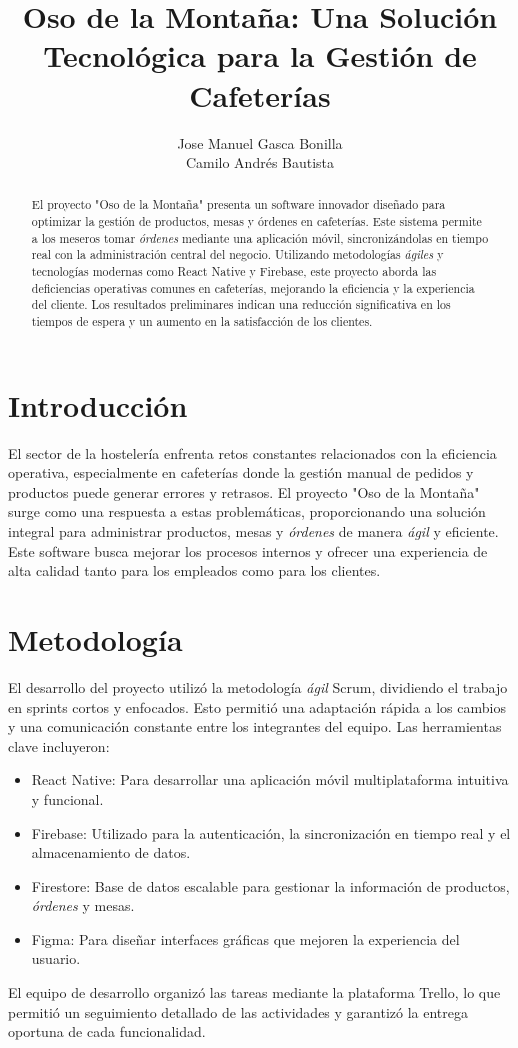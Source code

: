 \documentclass[12pt,a4paper]{article}
\title{Oso de la Monta\~na: Una Soluci\'on Tecnol\'ogica para la Gesti\'on de Cafeter\'ias}
\author{Jose Manuel Gasca Bonilla \\
Camilo Andr\'es Bautista}
\date{}
\begin{document}
\maketitle

\begin{abstract}
El proyecto "Oso de la Monta\~na" presenta un software innovador dise\~nado para optimizar la gesti\'on de productos, mesas y \'ordenes en cafeter\'ias. Este sistema permite a los meseros tomar \textit{\'ordenes} mediante una aplicaci\'on m\'ovil, sincroniz\'andolas en tiempo real con la administraci\'on central del negocio. Utilizando metodolog\'ias \textit{\'agiles} y tecnolog\'ias modernas como React Native y Firebase, este proyecto aborda las deficiencias operativas comunes en cafeter\'ias, mejorando la eficiencia y la experiencia del cliente. Los resultados preliminares indican una reducci\'on significativa en los tiempos de espera y un aumento en la satisfacci\'on de los clientes.
\end{abstract}

\section{Introducci\'on}
El sector de la hosteler\'ia enfrenta retos constantes relacionados con la eficiencia operativa, especialmente en cafeter\'ias donde la gesti\'on manual de pedidos y productos puede generar errores y retrasos. El proyecto "Oso de la Monta\~na" surge como una respuesta a estas problem\'aticas, proporcionando una soluci\'on integral para administrar productos, mesas y \textit{\'ordenes} de manera \textit{\'agil} y eficiente. Este software busca mejorar los procesos internos y ofrecer una experiencia de alta calidad tanto para los empleados como para los clientes.

\section{Metodolog\'ia}
El desarrollo del proyecto utiliz\'o la metodolog\'ia \textit{\'agil} Scrum, dividiendo el trabajo en sprints cortos y enfocados. Esto permiti\'o una adaptaci\'on r\'apida a los cambios y una comunicaci\'on constante entre los integrantes del equipo. Las herramientas clave incluyeron:
\begin{itemize}
    \item React Native: Para desarrollar una aplicaci\'on m\'ovil multiplataforma intuitiva y funcional.
    \item Firebase: Utilizado para la autenticaci\'on, la sincronizaci\'on en tiempo real y el almacenamiento de datos.
    \item Firestore: Base de datos escalable para gestionar la informaci\'on de productos, \textit{\'ordenes} y mesas.
    \item Figma: Para dise\~nar interfaces gr\'aficas que mejoren la experiencia del usuario.
\end{itemize}
El equipo de desarrollo organiz\'o las tareas mediante la plataforma Trello, lo que permiti\'o un seguimiento detallado de las actividades y garantiz\'o la entrega oportuna de cada funcionalidad.
\end{document}
